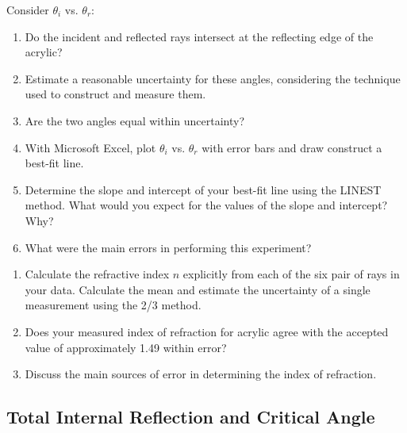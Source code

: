 Consider $\theta_{i}$ vs. $\theta_{r}$:
\begin{enumerate}
	\item Do the incident and reflected rays intersect at the reflecting edge of the acrylic?
	\item Estimate a reasonable uncertainty for these angles, considering the technique used to construct and measure them.
	\item Are the two angles equal within uncertainty?
	\item With Microsoft Excel, plot $\theta_{i}$ vs. $\theta_{r}$ with error bars and draw construct a best-fit line.
  \item Determine the slope and intercept of your best-fit line using the LINEST method. What would you expect for the values of the slope and intercept? Why?
  \item What were the main errors in performing this experiment?
\end{enumerate}
\myskip

\begin{enumerate}
    \item Calculate the refractive index $n$ explicitly from each of the six pair of rays in your data. Calculate the mean and estimate the uncertainty of a single measurement using the 2/3 method.
    \item Does your measured index of refraction for acrylic agree with the accepted value of approximately 1.49 within error?
    \item Discuss the main sources of error in determining the index of refraction.
\end{enumerate}

\subsection{Total Internal Reflection and Critical Angle}

